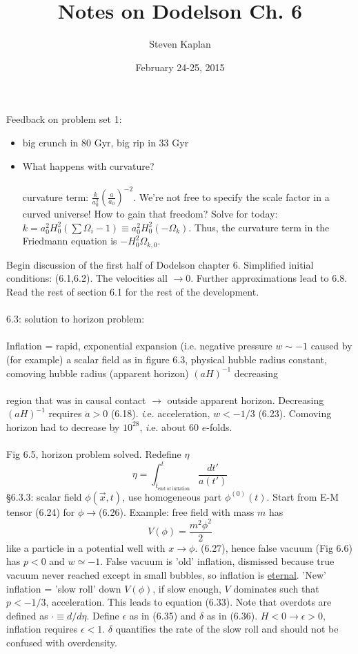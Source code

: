 \documentclass{article}
\title{Notes on Dodelson Ch. 6}
\author{Steven Kaplan}
\date{February 24-25, 2015}
\begin{document}
\maketitle
Feedback on problem set 1:
\begin{itemize}
\item big crunch in 80 Gyr, big rip in 33 Gyr
\item What happens with curvature?\\ \\
curvature term: $\frac{k}{a_0^2}\left(\frac{a}{a_0}\right)^{-2}$.  We're not free to specify the scale factor in a curved universe!  How to gain that freedom?  Solve for today: $k=a_0^2H_0^2\left(\sum\Omega_i-1\right) \equiv a_0^2H_0^2(-\Omega_k)$.  Thus, the curvature term in the Friedmann equation is $-H_0^2\Omega_{k,0}$.
\end{itemize}
Begin discussion of the first half of Dodelson chapter 6.  Simplified initial conditions: (6.1,6.2).  The velocities all $\rightarrow 0$.  Further approximations lead to 6.8.  Read the rest of section 6.1 for the rest of the development.
\\ \\
6.3: solution to horizon problem:
\\ \\
Inflation = rapid, exponential expansion (i.e. negative pressure $w\sim-1$ caused by (for example) a scalar field as in figure 6.3, physical hubble radius constant, comoving hubble radius (apparent horizon) $(aH)^{-1}$ decreasing
\\ \\
region that was in causal contact $\rightarrow$ outside apparent horizon.  Decreasing $(aH)^{-1}$ requires $\ddot{a}>0$ (6.18).  {\emph i.e.} acceleration, $w<-1/3$ (6.23).  Comoving horizon had to decrease by $10^{28}$, {\emph i.e}. about 60 $e$-folds.
\\ \\
Fig 6.5, horizon problem solved.  Redefine $\eta$
$$\eta=\int_{t_{\mathrm{end\;of\;inflation}}}^{t}\frac{dt'}{a(t')}$$
\S 6.3.3: scalar field $\phi(\vec{x},t)$, use homogeneous part $\phi^{(0)}(t)$.  Start from E-M tensor (6.24) for $\phi\rightarrow$(6.26).  Example: free field with mass $m$ has
$$V(\phi)=\frac{m^2\phi^2}{2}$$
like a particle in a potential well with $x\rightarrow\phi$.  (6.27), hence false vacuum (Fig 6.6) has $p<0$ and $w\simeq-1$.  False vacuum is 'old' inflation, dismissed because true vacuum never reached except in small bubbles, so inflation is \underline{eternal}.  'New' inflation = 'slow roll' down $V(\phi)$, if slow enough, $V$ dominates such that $p<-1/3$, acceleration.  This leads to equation (6.33).  Note that overdots are defined as $\cdot \equiv d/d\eta$.  Define $\epsilon$ as in (6.35) and $\delta$ as in (6.36).  $H<0\rightarrow \epsilon>0$, inflation requires $\epsilon<1$.  $\delta$ quantifies the rate of the slow roll and should not be confused with overdensity.
\end{document}
